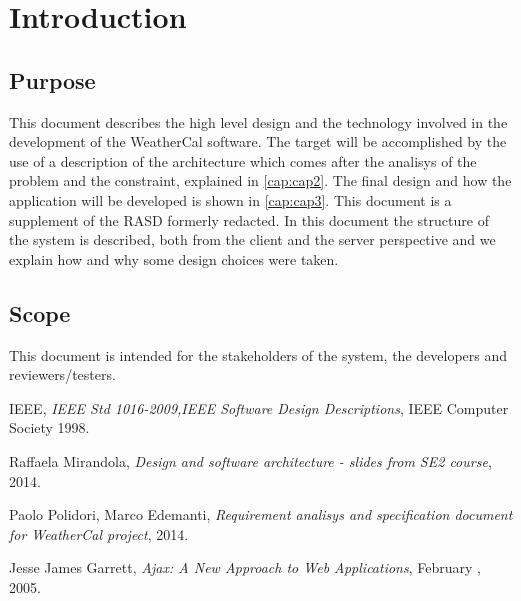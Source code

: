 \chapter{Introduction} \label{cap:cap1}

\section{Purpose}
This document describes the high level design and the technology involved in the development of the WeatherCal software. The target will be accomplished by the use of a description of the architecture which comes after the analisys of the problem and the constraint, explained in \autoref{cap:cap2}. The final design and how the application will be developed is shown in \autoref{cap:cap3}. This document is a supplement of the RASD formerly redacted.
In this document the structure of the system is described, both from the client and the server perspective and we explain how and why some design choices were taken.

\section{Scope}
This document is intended for the stakeholders of the system, the developers and reviewers/testers.


\begin{thebibliography}{9}
IEEE,
\textit{IEEE Std 1016-2009,IEEE Software Design Descriptions},
IEEE Computer Society 1998.
 
Raffaela Mirandola,
\textit{Design and software architecture - slides from SE2 course},
2014.
 
Paolo Polidori, Marco Edemanti,
\textit{Requirement analisys and specification document for WeatherCal project},
2014.

Jesse James Garrett,
\textit{Ajax: A New Approach to Web Applications},
February , 2005.
\end{thebibliography}